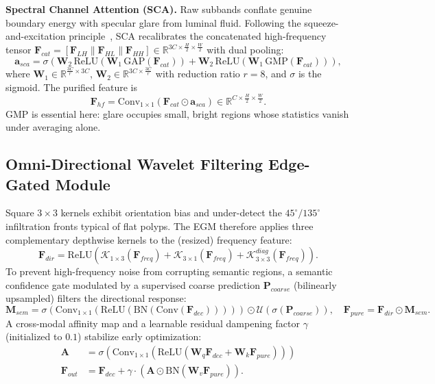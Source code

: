 \documentclass[journal]{IEEEtran}
\begin{document}
\textbf{Spectral Channel Attention (SCA).} Raw subbands conflate genuine boundary energy with specular glare from luminal fluid. Following the squeeze-and-excitation principle~\cite{hu2018senet}, SCA recalibrates the concatenated high-frequency tensor $\mathbf{F}_{cat}=[\mathbf{F}_{LH} \| \mathbf{F}_{HL} \| \mathbf{F}_{HH}] \in \mathbb{R}^{3C \times \frac{H}{2} \times \frac{W}{2}}$ with dual pooling:
\begin{equation}
    \mathbf{a}_{sca} = \sigma\!\left( \mathbf{W}_2\,\mathrm{ReLU}(\mathbf{W}_1\,\mathrm{GAP}(\mathbf{F}_{cat})) + \mathbf{W}_2\,\mathrm{ReLU}(\mathbf{W}_1\,\mathrm{GMP}(\mathbf{F}_{cat})) \right),
\end{equation}
where $\mathbf{W}_1 \in \mathbb{R}^{\frac{3C}{r} \times 3C}$, $\mathbf{W}_2 \in \mathbb{R}^{3C \times \frac{3C}{r}}$ with reduction ratio $r{=}8$, and $\sigma$ is the sigmoid. The purified feature is
\begin{equation}
    \mathbf{F}_{hf} = \mathrm{Conv}_{1\times1}(\mathbf{F}_{cat} \odot \mathbf{a}_{sca}) \in \mathbb{R}^{C \times \frac{H}{2} \times \frac{W}{2}}.
\end{equation}
GMP is essential here: glare occupies small, bright regions whose statistics vanish under averaging alone.

\subsection{Omni-Directional Wavelet Filtering Edge-Gated Module}
Square $3{\times}3$ kernels exhibit orientation bias and under-detect the $45^{\circ}/135^{\circ}$ infiltration fronts typical of flat polyps. The EGM therefore applies three complementary depthwise kernels to the (resized) frequency feature:
\begin{equation}
    \mathbf{F}_{dir} = \mathrm{ReLU}\!\left( \mathcal{K}_{1\times3}(\mathbf{F}_{freq}) + \mathcal{K}_{3\times1}(\mathbf{F}_{freq}) + \mathcal{K}_{3\times3}^{diag}(\mathbf{F}_{freq}) \right).
\end{equation}
To prevent high-frequency noise from corrupting semantic regions, a semantic confidence gate modulated by a supervised coarse prediction $\mathbf{P}_{coarse}$ (bilinearly upsampled) filters the directional response:
\begin{equation}
    \mathbf{M}_{sem} = \sigma(\mathrm{Conv}_{1\times1}(\mathrm{ReLU}(\mathrm{BN}(\mathrm{Conv}(\mathbf{F}_{dec}))))) \odot \mathcal{U}(\sigma(\mathbf{P}_{coarse})), \quad
    \mathbf{F}_{pure} = \mathbf{F}_{dir} \odot \mathbf{M}_{sem}.
\end{equation}
A cross-modal affinity map and a learnable residual dampening factor $\gamma$ (initialized to $0.1$) stabilize early optimization:
\begin{align}
    \mathbf{A} &= \sigma\!\left( \mathrm{Conv}_{1\times1}\!\left( \mathrm{ReLU}\left( \mathbf{W}_q \mathbf{F}_{dec} + \mathbf{W}_k \mathbf{F}_{pure} \right) \right) \right) \\
    \mathbf{F}_{out} &= \mathbf{F}_{dec} + \gamma \cdot \left( \mathbf{A} \odot \mathrm{BN}(\mathbf{W}_v \mathbf{F}_{pure}) \right).
\end{align}
\end{document}
